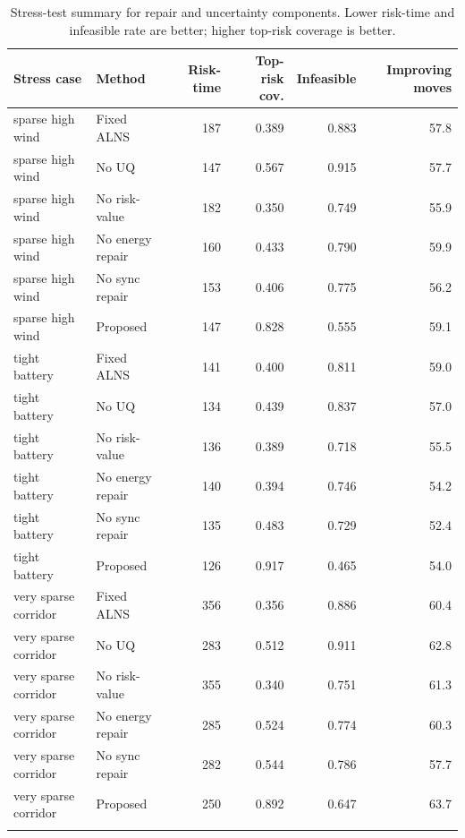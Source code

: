 \begin{table}[t]
\centering
\caption{Stress-test summary for repair and uncertainty components. Lower risk-time and infeasible rate are better; higher top-risk coverage is better.}
\label{tab:stress-results}
\footnotesize
\begin{tabular}{@{}llrrrr@{}}
\toprule
Stress case & Method & Risk-time & Top-risk cov. & Infeasible & Improving moves \\
\midrule
sparse high wind & Fixed ALNS & 187 & 0.389 & 0.883 & 57.8 \\
sparse high wind & No UQ & 147 & 0.567 & 0.915 & 57.7 \\
sparse high wind & No risk-value & 182 & 0.350 & 0.749 & 55.9 \\
sparse high wind & No energy repair & 160 & 0.433 & 0.790 & 59.9 \\
sparse high wind & No sync repair & 153 & 0.406 & 0.775 & 56.2 \\
sparse high wind & Proposed & 147 & 0.828 & 0.555 & 59.1 \\
\addlinespace[2pt]
tight battery & Fixed ALNS & 141 & 0.400 & 0.811 & 59.0 \\
tight battery & No UQ & 134 & 0.439 & 0.837 & 57.0 \\
tight battery & No risk-value & 136 & 0.389 & 0.718 & 55.5 \\
tight battery & No energy repair & 140 & 0.394 & 0.746 & 54.2 \\
tight battery & No sync repair & 135 & 0.483 & 0.729 & 52.4 \\
tight battery & Proposed & 126 & 0.917 & 0.465 & 54.0 \\
\addlinespace[2pt]
very sparse corridor & Fixed ALNS & 356 & 0.356 & 0.886 & 60.4 \\
very sparse corridor & No UQ & 283 & 0.512 & 0.911 & 62.8 \\
very sparse corridor & No risk-value & 355 & 0.340 & 0.751 & 61.3 \\
very sparse corridor & No energy repair & 285 & 0.524 & 0.774 & 60.3 \\
very sparse corridor & No sync repair & 282 & 0.544 & 0.786 & 57.7 \\
very sparse corridor & Proposed & 250 & 0.892 & 0.647 & 63.7 \\
\addlinespace[2pt]
\bottomrule
\end{tabular}
\end{table}
